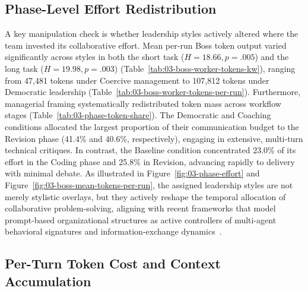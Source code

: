 \subsection{Phase-Level Effort Redistribution}
\label{subsec:phase-level-effort-redistribution}

A key manipulation check is whether leadership styles actively altered where the team invested its collaborative effort.
Mean per-run Boss token output varied significantly across styles in both the short task ($H = 18.66, p = .005$) and the long task ($H = 19.98, p = .003$) (Table~\ref{tab:03-boss-worker-tokens-kw}), ranging from 47,481 tokens under Coercive management to 107,812 tokens under Democratic leadership (Table~\ref{tab:03-boss-worker-tokens-per-run}).
Furthermore, managerial framing systematically redistributed token mass across workflow stages (Table~\ref{tab:03-phase-token-share}).
The Democratic and Coaching conditions allocated the largest proportion of their communication budget to the Revision phase (41.4\% and 40.6\%, respectively), engaging in extensive, multi-turn technical critiques.
In contrast, the Baseline condition concentrated 23.0\% of its effort in the Coding phase and 25.8\% in Revision, advancing rapidly to delivery with minimal debate.
As illustrated in Figure~\ref{fig:03-phase-effort} and Figure~\ref{fig:03-boss-mean-tokens-per-run}, the assigned leadership styles are not merely stylistic overlays, 
but they actively reshape the temporal allocation of collaborative problem-solving, aligning with recent frameworks that model prompt-based organizational structures as active controllers of multi-agent behavioral signatures and information-exchange dynamics~\cite{dang2025multiagentcollaborationevolvingorchestration, guo2024embodiedllmagentslearn, kwak2026leadershipcoordinationcontrolbehavioral}.

\subsection{Per-Turn Token Cost and Context Accumulation}
\label{subsec:verbosity-response-inflation}

